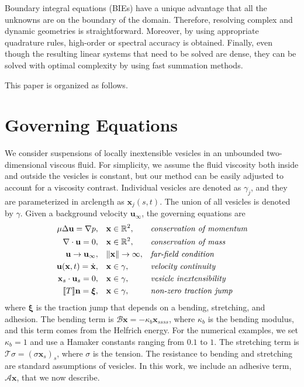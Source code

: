 \documentclass[%
preprint,
 amsmath,amssymb,
 aps,
]{revtex4-1}
\renewcommand{\AA}{\mathcal{A}}
\newcommand{\BB}{\mathcal{B}}
\newcommand{\nn}{\mathbf{n}}
\newcommand{\RR}{\mathbb{R}}
\newcommand{\TT}{\mathcal{T}}
\newcommand{\uu}{\mathbf{u}}
\newcommand{\xx}{\mathbf{x}}
\newcommand{\xxi}{\boldsymbol{\xi}}
\begin{document}
Boundary integral equations (BIEs) have a unique advantage that all the
unknowns are on the boundary of the domain.  Therefore, resolving
complex and dynamic geometries is straightforward.  Moreover, by using
appropriate quadrature rules, high-order or spectral accuracy is
obtained.  Finally, even though the resulting linear systems that need
to be solved are dense, they can be solved with optimal complexity by
using fast summation methods.  


This paper is organized as follows.




\section{Governing Equations}
We consider suspensions of locally inextensible vesicles in an unbounded
two-dimensional viscous fluid.  For simplicity, we assume the fluid
viscosity both inside and outside the vesicles is constant, but our
method can be easily adjusted to account for a viscosity contrast.
Individual vesicles are denoted as $\gamma_j$, and they are
parameterized in arclength as $\xx_j(s,t)$.  The union of all vesicles
is denoted by $\gamma$.  Given a background velocity $\uu_\infty$, the
governing equations are
\begin{equation*}
\begin{aligned}
  \mu \Delta \uu = \nabla p, \quad &\xx \in \RR^2,
    &&\mbox{\em conservation of momentum} \\
  \nabla \cdot \uu = 0, \quad &\xx \in \RR^2, 
    &&\mbox{\em conservation of mass} \\
  \uu \rightarrow \uu_\infty, \quad &\|\xx\| \rightarrow \infty,
    &&\mbox{\em far-field condition} \\
  \uu(\xx,t) = \dot{\xx}, \quad &\xx \in \gamma,
    &&\mbox{\em velocity continuity} \\
  \xx_s \cdot \uu_s =0, \quad &\xx \in \gamma,
    &&\mbox{\em vesicle inextensibility} \\
  \llbracket T \rrbracket \nn = \xxi, \quad &\xx \in \gamma,
    &&\mbox{\em non-zero traction jump}
\end{aligned}
\end{equation*}
where $\xxi$ is the traction jump that depends on a bending, stretching,
and adhesion.  The bending term is $\BB \xx = -\kappa_b \xx_{ssss}$,
where $\kappa_b$ is the bending modulus, and this term comes from the
Helfrich energy.  For the numerical examples, we set $\kappa_b = 1$ and
use a Hamaker constants ranging from $0.1$ to $1$.  The stretching term
is $\TT \sigma  = (\sigma \xx_s)_s$, where $\sigma$ is the tension.  The
resistance to bending and stretching are standard assumptions of
vesicles.  In this work, we include an adhesive term, $\AA \xx$, that we
now describe.
\end{document}
